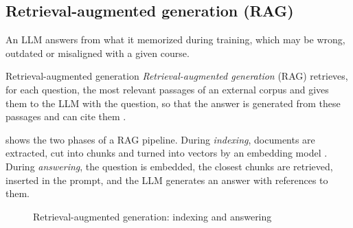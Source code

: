 \subsection{Retrieval-augmented generation (RAG)}
\label{subsec-rag}

An LLM answers from what it memorized during training, which may be
wrong, outdated or misaligned with a given course.

\begin{definitionbox}{Retrieval-augmented generation}
\emph{Retrieval-augmented generation} (RAG) retrieves, for each question,
the most relevant passages of an external corpus and gives them to the
LLM with the question, so that the answer is generated from these passages
and can cite them \cite{lewis2020,gao2023rag}.
\end{definitionbox}

 shows the two phases of a RAG pipeline. During
\emph{indexing}, documents are extracted, cut into chunks and turned into
vectors by an embedding model \cite{reimers2019,chen2024bgem3}. During
\emph{answering}, the question is embedded, the closest chunks are
retrieved, inserted in the prompt, and the LLM generates an answer with
references to them.

\begin{figure}[htbp]
\centering
{}
\caption{Retrieval-augmented generation: indexing and answering}
\label{fig-rag}
\end{figure}

